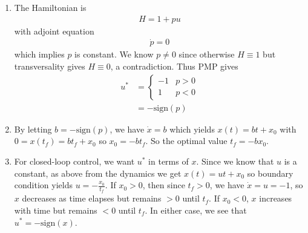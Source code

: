 \documentclass[12pt]{article}
\begin{document}
\begin{problem}[5]
\begin{enumerate}[label=(\alph*)]
\item The Hamiltonian is
	\begin{align*}
		H = 1+pu
	\end{align*}
with adjoint equation
\begin{align*}
	\dot{p} = 0
\end{align*}
which implies $ p$ is constant. We know  $ p \neq 0$ since otherwise  $ H \equiv 1$ but transversality gives  $ H \equiv 0$, a contradiction. Thus PMP gives
 \begin{align*}
	 u^* &= \begin{cases}
		-1 & p>0\\
		1 & p<0
	\end{cases}\\
	&= - \text{sign}(p)
\end{align*}
\item By letting $ b = - \text{sign}(p) $, we have $ \dot{x} = b$ which yields $ x(t) = bt+x_0$ with $0 =x(t_f) = bt_f + x_0$ so $ x_0 = -bt_f$. So the optimal value $ t_f = -b x_0$.
\item For closed-loop control, we want $ u^* $ in terms of  $ x$. Since we know that $ u$ is a constant, as above from the dynamics we get $ x(t) = ut+x_0$ so boundary condition yields $ u = - \frac{x_0}{ t_f}$. If $ x_0>0$, then since $ t_f >0$, we have $ \dot{x}=u=-1$, so $ x$ decreases as time elapses but remains $ >0$ until $ t_f$. If  $ x_0<0$, $ x$ increases with time but remains $ <0$ until $ t_f$. In either case, we see that $ u^*  = - \text{sign}(x) $. 
\end{enumerate}
\end{problem}
\end{document}
